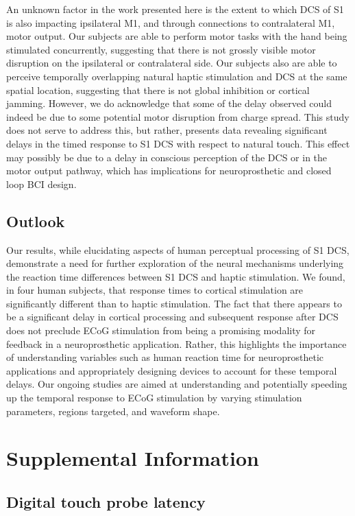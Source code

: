 An unknown factor in the work presented here is the extent to which DCS of S1 is also impacting ipsilateral M1, and through connections to contralateral M1, motor output. Our subjects are able to perform motor tasks with the hand being stimulated concurrently, suggesting that there is not grossly visible motor disruption on the ipsilateral or contralateral side. Our subjects also are able to perceive temporally overlapping natural haptic stimulation and DCS at the same spatial location, suggesting that there is not global inhibition or cortical jamming. However, we do acknowledge that some of the delay observed could indeed be due to some potential motor disruption from charge spread. This study does not serve to address this, but rather, presents data revealing significant delays in the timed response to S1 DCS with respect to natural touch. This effect may possibly be due to a delay in conscious perception of the DCS or in the motor output pathway, which has implications for neuroprosthetic and closed loop BCI design. 

\subsection{Outlook}

Our results, while elucidating aspects of human perceptual processing of S1 DCS, demonstrate a need for further exploration of the neural mechanisms underlying the reaction time differences between S1 DCS and haptic stimulation. We found, in four human subjects, that response times to cortical stimulation are significantly different than to haptic stimulation. The fact that there appears to be a significant delay in cortical processing and subsequent response after DCS does not preclude ECoG stimulation from being a promising modality for feedback in a neuroprosthetic application. Rather, this highlights the importance of understanding variables such as human reaction time for neuroprosthetic applications and appropriately designing devices to account for these temporal delays. Our ongoing studies are aimed at understanding and potentially speeding up the temporal response to ECoG stimulation by varying stimulation parameters, regions targeted, and waveform shape.

\section{Supplemental Information}

\subsection{Digital touch probe latency}

